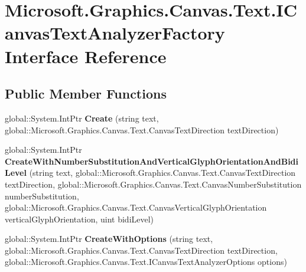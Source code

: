 \hypertarget{interface_microsoft_1_1_graphics_1_1_canvas_1_1_text_1_1_i_canvas_text_analyzer_factory}{}\section{Microsoft.\+Graphics.\+Canvas.\+Text.\+I\+Canvas\+Text\+Analyzer\+Factory Interface Reference}
\label{interface_microsoft_1_1_graphics_1_1_canvas_1_1_text_1_1_i_canvas_text_analyzer_factory}
\subsection*{Public Member Functions}
\begin{DoxyCompactItemize}
\item 
\mbox{\label{interface_microsoft_1_1_graphics_1_1_canvas_1_1_text_1_1_i_canvas_text_analyzer_factory_aec5674841ed2329598eb2ed3e89170f7}} 
global\+::\+System.\+Int\+Ptr {\bfseries Create} (string text, global\+::\+Microsoft.\+Graphics.\+Canvas.\+Text.\+Canvas\+Text\+Direction text\+Direction)
\item 
\mbox{\label{interface_microsoft_1_1_graphics_1_1_canvas_1_1_text_1_1_i_canvas_text_analyzer_factory_ab3d7e254f0ceac4bdd660a9922c725f7}} 
global\+::\+System.\+Int\+Ptr {\bfseries Create\+With\+Number\+Substitution\+And\+Vertical\+Glyph\+Orientation\+And\+Bidi\+Level} (string text, global\+::\+Microsoft.\+Graphics.\+Canvas.\+Text.\+Canvas\+Text\+Direction text\+Direction, global\+::\+Microsoft.\+Graphics.\+Canvas.\+Text.\+Canvas\+Number\+Substitution number\+Substitution, global\+::\+Microsoft.\+Graphics.\+Canvas.\+Text.\+Canvas\+Vertical\+Glyph\+Orientation vertical\+Glyph\+Orientation, uint bidi\+Level)
\item 
\mbox{\label{interface_microsoft_1_1_graphics_1_1_canvas_1_1_text_1_1_i_canvas_text_analyzer_factory_a40e77ae7b0745b17858257c35808df74}} 
global\+::\+System.\+Int\+Ptr {\bfseries Create\+With\+Options} (string text, global\+::\+Microsoft.\+Graphics.\+Canvas.\+Text.\+Canvas\+Text\+Direction text\+Direction, global\+::\+Microsoft.\+Graphics.\+Canvas.\+Text.\+I\+Canvas\+Text\+Analyzer\+Options options)

\end{DoxyCompactItemize}
